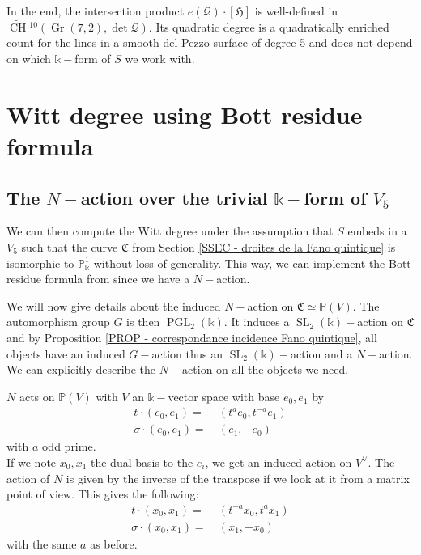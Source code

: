 \documentclass{amsart}
\theoremstyle{plain}%
\theoremstyle{remark}
\theoremstyle{definition}
\newcommand{\cQ}{\mathcal{Q}}
\newcommand{\ek}{\mathbb{k}}
\newcommand{\eP}{\mathbb{P}}
\newcommand{\fC}{\mathfrak{C}}
\newcommand{\fH}{\mathfrak{H}}
\newcommand{\Chowtilde}[2][]{\widetilde{\operatorname{CH}}{}^{#1}\!\left(#2\right)}
\newcommand{\SL}{\operatorname{SL}}
\newcommand{\PGL}{\operatorname{PGL}}
\newcommand{\Grass}{\operatorname{Gr}}
\begin{document}
In the end, the intersection product $e(\cQ) \cdot [\fH]$ is well-defined in $\Chowtilde[10]{\Grass(7,2),\det \cQ}.$ Its quadratic degree is a quadratically enriched count for the lines in a smooth del Pezzo surface of degree 5 and does not depend on which $\ek-$form of $S$ we work with.








\section{Witt degree using Bott residue formula}\label{SEC - calcul Witt schema Hilbert}


\subsection{The $N-$action over the trivial $\ek-$form of $V_5$}\label{SSEC - resultats prelim}


We can then compute the Witt degree under the assumption that $S$ embeds in a $V_5$ such that the curve $\fC$ from Section \ref{SSEC - droites de la Fano quintique} is isomorphic to $\eP^1_\ek$ without loss of generality. This way, we can implement the Bott residue formula from \cite{LevineAB24} since we have a $N-$action. 


We will now give details about the induced $N-$action on $\fC \simeq \eP(V)$. The automorphism group $G$ is then $\PGL_2(\ek).$ It induces a $\SL_2(\ek)-$action on $\fC$ and by Proposition \ref{PROP - correspondance incidence Fano quintique}, all objects have an induced $G-$action thus an $\SL_2(\ek)-$action and a $N-$action. We can explicitly describe the $N-$action on all the objects we need.

$N$ acts on $\eP(V)$ with $V$ an $\ek-$vector space with base $e_0,e_1$ by 
\begin{align*}
    t\cdot (e_0,e_1) = &\ (t^a e_0,t^{-a}e_1)\\
    \sigma\cdot (e_0,e_1) = &\ (e_1,-e_0)
\end{align*}
with $a$ odd prime.\\
If we note $x_0,x_1$ the dual basis to the $e_i$, we get an induced action on $V^\vee$. The action of $N$ is given by the inverse of the transpose if we look at it from a matrix point of view. This gives the following:
\begin{align*}
    t\cdot (x_0,x_1) = &\ (t^{-a} x_0,t^{a}x_1)\\
    \sigma\cdot (x_0,x_1) =&\ (x_1,-x_0)
\end{align*}
with the same $a$ as before.
\end{document}
